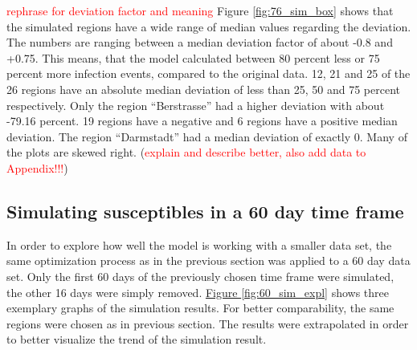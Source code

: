 \textcolor{red}{rephrase for deviation factor and meaning}
Figure \ref*{fig:76_sim_box} shows that the simulated regions have a wide range of median values regarding the deviation.
The numbers are ranging between a median deviation factor of about -0.8 and +0.75. This means, that the model calculated
between 80 percent less or 75 percent more infection events, compared to the original data. 12, 21 and 25 of the 26 regions have
an absolute median deviation of less than 25, 50 and 75 percent respectively. Only the region ``Berstrasse'' had a higher deviation with
about -79.16 percent. 19 regions have a negative and 6 regions have a positive median deviation. The region ``Darmstadt'' had a
median deviation of exactly 0. Many of the plots are skewed right.
(\textcolor{red}{explain and describe better, also add data to Appendix!!!})



\subsection{Simulating susceptibles in a 60 day time frame}
In order to explore how well the model is working with a smaller data set, the same optimization process as in the previous section was
applied to a 60 day data set. Only the first 60 days of the previously chosen time frame were simulated, the other 16 days were
simply removed. \hyperref[fig:60_sim_expl]{Figure \ref*{fig:60_sim_expl}} shows three exemplary graphs of the simulation results.
For better comparability, the same regions were chosen as in previous section. The results were extrapolated in order to better visualize
the trend of the simulation result.

